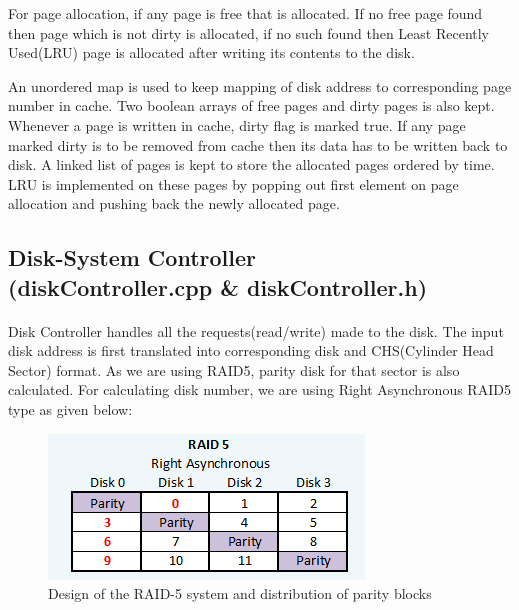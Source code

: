 \documentclass[11pt]{article}
\begin{document}
For page allocation, if any page is free that is allocated. If no free page found then page which is not dirty is allocated, if no such found then Least Recently Used(LRU) page is allocated after writing its contents to the disk.

An unordered map is used to keep mapping of disk address to corresponding page number in cache. Two boolean arrays of free pages and dirty pages is also kept. Whenever a page is written in cache, dirty flag is marked true. If any page marked dirty is to be removed from cache then its data has to be written back to disk. A linked list of pages is kept to store the allocated pages ordered by time. LRU is implemented on these pages by popping out first element on page allocation and pushing back the newly allocated page.

\subsection{Disk-System Controller \\ (diskController.cpp \& diskController.h)}
\paragraph{}
Disk Controller handles all the requests(read/write) made to the disk. The input disk address is first translated into corresponding disk and CHS(Cylinder Head Sector) format. As we are using RAID5, parity disk for that sector is also calculated. For calculating disk number, we are using Right Asynchronous RAID5 type as given below:

\begin{figure}[ht!]
\center
\includegraphics[scale = 1.40]{images/raid5.png}
\caption{Design of the RAID-5 system and distribution of parity blocks}
\label{overflow}
\end{figure}
\end{document}
